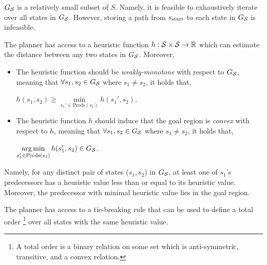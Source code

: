 \documentclass[a4paper]{report}
\begin{document}
\vspace{2mm}\begin{assumption} \label{asm:1:1} $G_\mathcal{S}$ is a relatively small subset of $S$. Namely, it is feasible to exhaustively iterate over all states in $G_\mathcal{S}$.
However, storing a path from $s_{\textrm{start}}$ to each state in $G_\mathcal{S}$ is infeasible.
\end{assumption}
  
\vspace{2mm}\begin{assumption} \label{asm:1:2} The planner has access to a heuristic function $h: \mathcal{S} \times \mathcal{S} \rightarrow \mathbb{R}$ which can estimate the distance between any two states in $G_\mathcal{S}$. Moreover, 
 \begin{itemize}
  \item The heuristic function should be \textit{weakly-monotone} with respect to $G_\mathcal{S}$, meaning that $\forall s_1, s_2  \in G_\mathcal{S}$ where $s_1 \neq s_2 $, it holds that,
  \begin{center}
    $h(s_1, s_2) \geq \min\limits_{s_1' \in \text{Preds}(s_1)} h(s_1', s_2)$.
  \end{center}

  \item The heuristic function $h$ should induce that the goal region is \emph{convex} with respect to $h$, meaning that $\forall s_1, s_2  \in G_\mathcal{S}$ where $s_1 \neq s_2 $, it holds that,
  \begin{center}
     $\operatorname*{arg\,min}\limits_{s_1' \in \text{Preds}(s_1)} h(s_1', s_2) \in G_\mathcal{S}$.
  \end{center}

 \end{itemize}
 Namely, for any distinct pair of states ($s_1, s_2$) in $G_\mathcal{S}$, at least one of $s_1$'s predecessors has a heuristic value less than or equal to its heuristic value.
 Moreover, the predecessor with minimal heuristic value lies in the goal region.
\end{assumption}

\vspace{2mm}\begin{assumption} \label{asm:1:3} The planner has access to a tie-breaking rule that can be used to define a total order \footnote{A total order is a binary relation on some set which is anti-symmetric, transitive, and a convex relation.} over all states with the same heuristic value.
\end{assumption}
\end{document}
